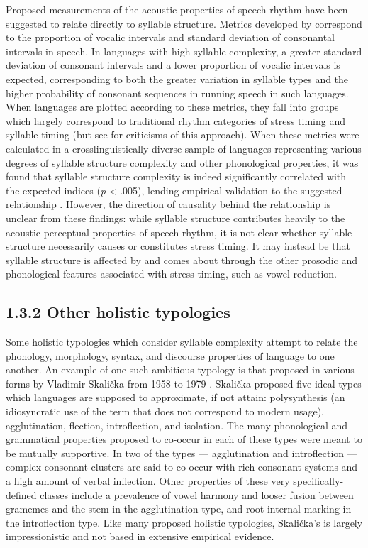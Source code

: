   Proposed measurements of the acoustic properties of speech rhythm have been suggested to relate directly to syllable structure. Metrics developed by \citet{RamusEtAl1999} correspond to the proportion of vocalic intervals and standard deviation of consonantal intervals in speech. In languages with high syllable complexity, a greater standard deviation of consonant intervals and a lower proportion of vocalic intervals is expected, corresponding to both the greater variation in syllable types and the higher probability of consonant sequences in running speech in such languages. When languages are plotted according to these metrics, they fall into groups which largely correspond to traditional rhythm categories of stress timing and syllable timing (but see \citealt{WigetEtAl2010} for criticisms of this approach). When these metrics were calculated in a crosslinguistically diverse sample of languages representing various degrees of syllable structure complexity and other phonological properties, it was found that syllable structure complexity is indeed significantly correlated with the expected indices (\textit{p} < .005), lending empirical validation to the suggested relationship \citep{EasterdayEtAl2011}. However, the direction of causality behind the relationship is unclear from these findings: while syllable structure contributes heavily to the acoustic-perceptual properties of speech rhythm, it is not clear whether syllable structure necessarily causes or constitutes stress timing. It may instead be that syllable structure is affected by and comes about through the other prosodic and phonological features associated with stress timing, such as vowel reduction.

\subsection{1.3.2 Other holistic typologies}

\textsf{} Some holistic typologies which consider syllable complexity attempt to relate the phonology, morphology, syntax, and discourse properties of language to one another. An example of one such ambitious typology is that proposed in various forms by Vladimir Skalička from 1958 to 1979 \citep{Plank1998}. Skalička  proposed five ideal types which languages are supposed to approximate, if not attain: polysynthesis (an idiosyncratic use of the term that does not correspond to modern usage), agglutination, flection, introflection, and isolation. The many phonological and grammatical properties proposed to co-occur in each of these types were meant to be mutually supportive. In two of the types — agglutination and introflection — complex consonant clusters are said to co-occur with rich consonant systems and a high amount of verbal inflection. Other properties of these very specifically-defined classes include a prevalence of vowel harmony and looser fusion between gramemes and the stem in the agglutination type, and root-internal marking in the introflection type. Like many proposed holistic typologies, Skalička’s is largely impressionistic and not based in extensive empirical evidence.

